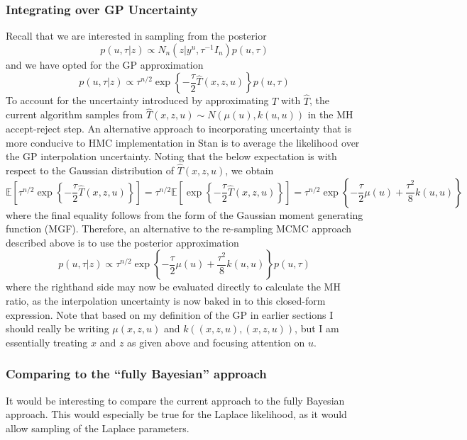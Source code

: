 \documentclass[12pt]{article}
\newcommand{\E}{\mathbb{E}}
\begin{document}
\subsubsection{Integrating over GP Uncertainty}
Recall that we are interested in sampling from the posterior
\[p(u, \tau|z) \propto N_n(z|y^u, \tau^{-1} I_n)p(u, \tau)\]
and we have opted for the GP approximation 
\[p(u, \tau|z) \propto \tau^{n/2} \exp\left\{-\frac{\tau}{2} \hat{T}(x, z, u) \right\}p(u, \tau)\]
To account for the uncertainty introduced by approximating $T$ with $\hat{T}$, the current algorithm samples from $\hat{T}(x, z, u) \sim N(\mu(u), k(u, u))$ in the MH 
accept-reject step. An alternative approach to incorporating uncertainty that is more conducive to HMC implementation in Stan is to average the likelihood over the GP 
interpolation uncertainty. Noting that the below expectation is with respect to the Gaussian distribution of $\hat{T}(x, z, u)$, we obtain 
\[\E \left[\tau^{n/2} \exp\left\{-\frac{\tau}{2} \hat{T}(x, z, u)\right\} \right] = \tau^{n/2} \E \left[ \exp\left\{-\frac{\tau}{2} \hat{T}(x, z, u)\right\} \right] = \tau^{n/2} \exp\left\{-\frac{\tau}{2}\mu(u) + \frac{\tau^2}{8} k(u, u)\right\}\]
where the final equality follows from the form of the Gaussian moment generating function (MGF). Therefore, an alternative to the re-sampling MCMC approach described above is to use the posterior approximation
\[p(u, \tau|z) \propto \tau^{n/2} \exp\left\{-\frac{\tau}{2}\mu(u) + \frac{\tau^2}{8} k(u, u)\right\}p(u, \tau)\]
where the righthand side may now be evaluated directly to calculate the MH ratio, as the interpolation uncertainty is now baked in to this closed-form expression. Note that based on my definition of the GP in earlier sections I should really be writing $\mu(x, z, u)$ and $k((x, z, u), (x, z, u))$, but I am essentially treating $x$ and $z$ as given above and focusing attention on $u$. 

\subsubsection{Comparing to the ``fully Bayesian'' approach}
It would be interesting to compare the current approach to the fully Bayesian approach. This would especially be true for the Laplace likelihood, as it would allow sampling of 
the Laplace parameters. 
\end{document}
